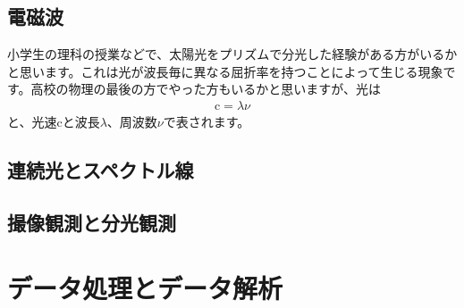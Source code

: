 \subsection{電磁波}
\label{sec_2_2_1}
小学生の理科の授業などで、太陽光をプリズムで分光した経験がある方がいるかと思います。これは光が波長毎に異なる屈折率を持つことによって生じる現象です。高校の物理の最後の方でやった方もいるかと思いますが、光は
\begin{align}
    \mathrm{c} = \lambda \nu
\end{align}
と、光速$\mathrm{c}$と波長$\lambda$、周波数$\nu$で表されます。

\subsection{連続光とスペクトル線}
\label{sec_2_2_2}


\subsection{撮像観測と分光観測}
\label{subsec_2_2_3}

\section{データ処理とデータ解析}
\label{sec_2_3}
    